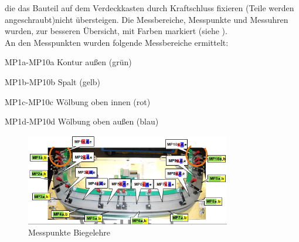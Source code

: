 \documentclass[12pt,a4paper,parskip]{scrartcl}
\begin{document}
 
  die das Bauteil auf dem Verdeckkasten durch Kraftschluss fixieren (Teile werden angeschraubt)nicht übersteigen. Die Messbereiche, Messpunkte und Messuhren wurden, zur besseren Übersicht, mit Farben markiert (siehe ).  \\
 An den Messpunkten wurden folgende Messbereiche ermittelt:
 \begin{description*}
 \item[MP1a-MP10a] Kontur außen (grün)
 \item[MP1b-MP10b] Spalt (gelb)
 \item[MP1c-MP10c] Wölbung oben innen (rot)
 \item[MP1d-MP10d] Wölbung oben außen (blau)
 \end{description*}
\begin{figure}[hbtp]
\centering
\includegraphics[width=0.8\textwidth]{messpunktevdkda3}
\caption{Messpunkte Biegelehre}
\label{fig:messpunktevdkda3}
\end{figure} 
 
 
 
\end{document}
